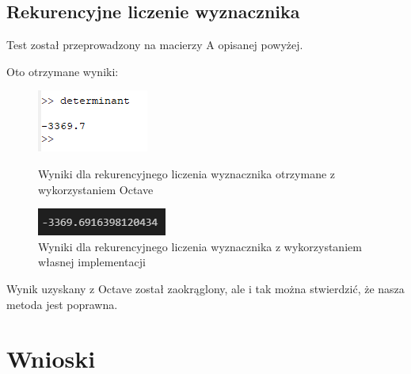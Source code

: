 \documentclass{article}
\begin{document}
\subsection{Rekurencyjne liczenie wyznacznika}

Test został przeprowadzony na macierzy A opisanej powyżej.

\noindent
Oto otrzymane wyniki:

\begin{figure}[H]
  \begin{minipage}[b]{0.49\textwidth}
    \includegraphics[width=\textwidth]{images/octave_comparison_determinant_octave.png}
    \caption{Wyniki dla rekurencyjnego liczenia wyznacznika otrzymane z wykorzystaniem Octave}
  \end{minipage}
  \hfill
  \begin{minipage}[b]{0.49\textwidth}
    \includegraphics[width=\textwidth]{images/octave_comparison_determinant_own.png}
    \caption{Wyniki dla rekurencyjnego liczenia wyznacznika z wykorzystaniem własnej implementacji}
  \end{minipage}
\end{figure}

\noindent
Wynik uzyskany z Octave został zaokrąglony, ale i tak można stwierdzić, że nasza metoda jest poprawna.

\section{Wnioski}
\end{document}
